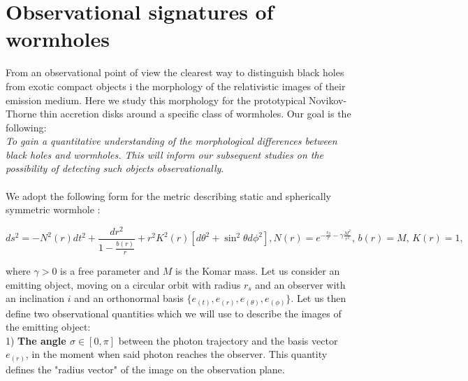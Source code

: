 \documentclass[12pt]{article}
\numberwithin{equation}{section}
\numberwithin{figure}{section}
\begin{document}
	\newpage
	
	\section{Observational signatures of wormholes}
	
	From an observational point of view the clearest way to distinguish black holes from exotic compact objects i the morphology of the relativistic images of their emission medium. Here we study this morphology for the prototypical Novikov-Thorne thin accretion disks \cite{Page1973} around a specific class of wormholes. Our goal is the following:\\
	
	\noindent\emph{To gain a quantitative understanding of the morphological differences between black holes and wormholes. This will inform our subsequent studies on the possibility of detecting such objects observationally}.\\\\
	
	\noindent We adopt the following form for the metric describing static and spherically symmetric wormhole \cite{Morris1988}:
	
	\begin{subequations}
		\begin{equation}
			ds^2 = -N^2(r)dt^2 + \frac{dr^2}{1 - \frac{b(r)}{r}} + r^2K^2(r)\left[d\theta^2 + \sin^2\theta d\phi^2\right],
		\end{equation}
		\begin{equation}
			N(r) = e^{-\frac{r_0}{r} - \gamma\frac{M^2}{r^2}},\, b(r) = M,\, K(r) = 1,
		\end{equation}	
	\end{subequations}
	
	\noindent where $\gamma > 0$ is a free parameter and $M$ is the Komar mass. Let us consider an emitting object, moving on a circular orbit with radius $r_s$ and an observer with an inclination $i$ and an orthonormal basis $\{e_{(t)}, e_{(r)}, e_{(\theta)}, e_{(\phi)}\}$. Let us then define two observational quantities which we will use to describe the images of the emitting object:\\
	
	1) \textbf{The angle $\sigma\in[0,\pi]$} between the photon trajectory and the basis vector $e_{(r)}$, in the moment when said photon reaches the observer. This quantity defines the "radius vector" of the image on the observation plane.\\
	
\end{document}
